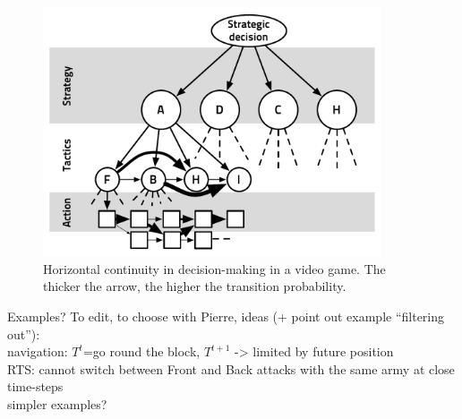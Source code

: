 \begin{figure}
\begin{center}
\includegraphics[width=10cm]{images/horizontal_cont_abstract_decision_hierarchy3.pdf}
\end{center}
\caption{Horizontal continuity in decision-making in a video game. The thicker the arrow, the higher the transition probability.}
\label{fig:horizontalcont}
\end{figure}

Examples? To edit, to choose with Pierre, ideas (+ point out example ``filtering out''):\\
navigation: $T^t$=go round the block, $T^{t+1}$ -> limited by future position\\
RTS: cannot switch between Front and Back attacks with the same army at close time-steps\\
simpler examples?

